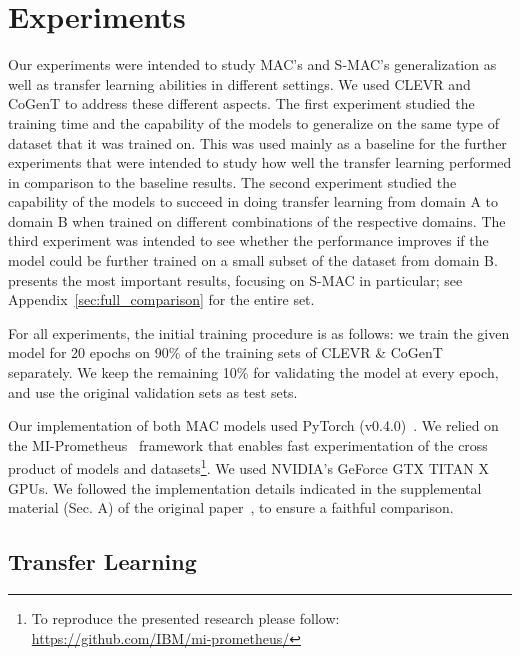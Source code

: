 \section{Experiments}
\label{sec:experiments}

Our experiments were intended to study MAC's and S-MAC's generalization as well as transfer learning abilities in different settings. We used CLEVR and CoGenT to address these different aspects.
The first experiment studied the training time and the capability of the models to generalize on the same type of dataset that it was trained on. This was used mainly as a baseline for the further experiments that were intended to study how well the transfer learning performed in comparison to the baseline results.
The second experiment studied the capability of the models to succeed in doing transfer learning from domain A to domain B when trained on different combinations of the respective domains. The third experiment was intended to see whether the performance improves if the model could be further trained on a small subset of the dataset from domain B.
 presents the most important results, focusing on S-MAC in particular; see Appendix~\ref{sec:full_comparison} for the entire set.

For all experiments, the initial training procedure is as follows: we train the given model  for 20 epochs on 90\% of the training sets of CLEVR \& CoGenT separately. We keep the remaining 10\% for validating the model at every epoch, and use the original validation sets as test sets.

Our implementation of both MAC models used PyTorch (v0.4.0)~\cite{paszke2017automatic}. We relied on the MI-Prometheus~\cite{kornuta2018accelerating} framework that enables fast experimentation of the cross product of models and datasets\footnote{To reproduce the presented research please follow:  \url{https://github.com/IBM/mi-prometheus/}}.
We used NVIDIA's GeForce GTX TITAN X GPUs. We followed the implementation details indicated in the supplemental material (Sec. A) of the original paper~\cite{hudson2018compositional}, to ensure a faithful comparison.

\subsection{Transfer Learning}
\label{sec:transfer_learning}

